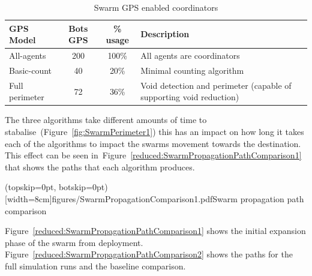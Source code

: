 \documentclass{ieeeaccess}
\begin{document}
\begin{table}
\begin{center}
\begin{tabular}{| p{1.5cm} | c | c | p{3cm} |}
\hline
GPS Model & Bots GPS & \% usage & Description \\ \hline
All-agents & 200 & 100\% & All agents are coordinators \\ \hline
Basic-count & 40 & 20\% & Minimal counting algorithm\\ \hline
Full perimeter & 72 & 36\% & Void detection and perimeter (capable of supporting void reduction)\\  \hline
\end{tabular}\caption{Swarm GPS enabled coordinators} \label{tab:GPSUsage}
\end{center}
\end{table}

The three algorithms take different amounts of time to stabalise~(Figure~\ref{fig:SwarmPerimeter1}) this has an impact on how long it takes each of the algorithms to impact the swarms movement towards the destination. This effect can be seen in~Figure~\ref{reduced:SwarmPropagationPathComparison1} that shows the paths that each algorithm produces. 


\Figure[t!](topskip=0pt, botskip=0pt)[width=8cm]{figures/SwarmPropagationComparison1.pdf}{Swarm propagation path comparison\label{reduced:SwarmPropagationPathComparison1}}

Figure~\ref{reduced:SwarmPropagationPathComparison1} shows the initial expansion phase of the swarm from deployment. Figure~\ref{reduced:SwarmPropagationPathComparison2} shows the paths for the full simulation runs and the baseline comparison.

\end{document}
